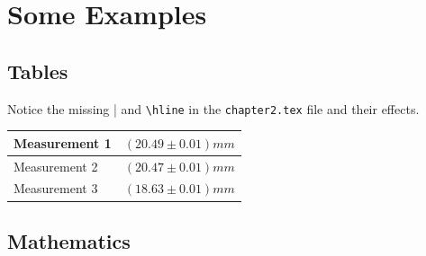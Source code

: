 \section{Some Examples}

\subsection{Tables}

Notice the missing | and \verb|\hline| in the \verb|chapter2.tex| file and their effects.

\begin{table}[H]
    \begin{tabular}[b]{ || l | l  }
        \hline %
        Measurement 1 & $(20.49 \pm 0.01)\si{mm}$ \\\hline
        Measurement 2 & $(20.47 \pm 0.01)\si{mm}$ \\%
        Measurement 3 & $(18.63 \pm 0.01)\si{mm}$ \\\hline
    \end{tabular}
\end{table}

\subsection{Mathematics}

